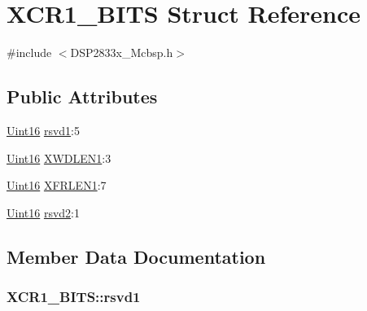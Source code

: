\hypertarget{struct_x_c_r1___b_i_t_s}{}\section{X\+C\+R1\+\_\+\+B\+I\+T\+S Struct Reference}
\label{struct_x_c_r1___b_i_t_s}


{\ttfamily \#include $<$D\+S\+P2833x\+\_\+\+Mcbsp.\+h$>$}

\subsection*{Public Attributes}
\begin{DoxyCompactItemize}
\item 
\hyperlink{_d_s_p2833x___device_8h_a59a9f6be4562c327cbfb4f7e8e18f08b}{Uint16} \hyperlink{struct_x_c_r1___b_i_t_s_a1c0b6fc5684298803989b5e4a0c062e8}{rsvd1}\+:5
\item 
\hyperlink{_d_s_p2833x___device_8h_a59a9f6be4562c327cbfb4f7e8e18f08b}{Uint16} \hyperlink{struct_x_c_r1___b_i_t_s_ac40b01a0a0f2c84ebc86e4bd77c8aaa3}{X\+W\+D\+L\+E\+N1}\+:3
\item 
\hyperlink{_d_s_p2833x___device_8h_a59a9f6be4562c327cbfb4f7e8e18f08b}{Uint16} \hyperlink{struct_x_c_r1___b_i_t_s_aa9d637408835737deda4a18ce456e2ed}{X\+F\+R\+L\+E\+N1}\+:7
\item 
\hyperlink{_d_s_p2833x___device_8h_a59a9f6be4562c327cbfb4f7e8e18f08b}{Uint16} \hyperlink{struct_x_c_r1___b_i_t_s_ae8daa7b16dcbf6ecbc431b8a6e3fe0d1}{rsvd2}\+:1
\end{DoxyCompactItemize}


\subsection{Member Data Documentation}
\hypertarget{struct_x_c_r1___b_i_t_s_a1c0b6fc5684298803989b5e4a0c062e8}{}
\subsubsection[{rsvd1}]{ X\+C\+R1\+\_\+\+B\+I\+T\+S\+::rsvd1}\label{struct_x_c_r1___b_i_t_s_a1c0b6fc5684298803989b5e4a0c062e8}
\hypertarget{struct_x_c_r1___b_i_t_s_ae8daa7b16dcbf6ecbc431b8a6e3fe0d1}{}
